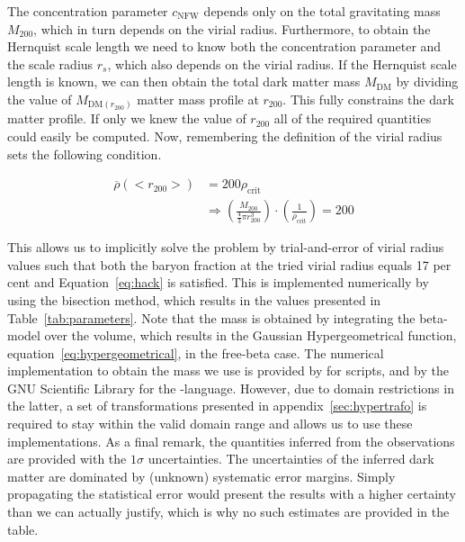 \documentclass[MScProj_TLRH_ClusterEnergy.tex]{subfiles}
\begin{document}
The concentration parameter $c_{\text{NFW}}$ depends only on the total 
gravitating mass $M_{200}$, which in turn depends on the virial radius.
Furthermore, to obtain the Hernquist scale length we need to know both
the concentration parameter and the scale radius $r_s$, which also depends 
on the virial radius. If the Hernquist scale length is known, we can then 
obtain the total dark matter mass $M_{\text{DM}}$ by dividing the value of 
$M_{\text{DM}(r_{200})}$ matter mass profile at $r_{200}$. This fully constrains
the dark matter profile. If only we knew the value of $r_{200}$ all of the
required quantities could easily be computed. Now, remembering the definition 
of the virial radius sets the following condition.

\begin{align}
    \overline{\rho}(<r_{200}>) &= 200 \rho_{\text{crit}} \\
    &\Rightarrow \left(\frac{M_{200}}{\frac{4}{3} \pi r_{200}^3} \right) \cdot
    \left( \frac{1}{\rho_{\text{crit}}} \right) = 200 \label{eq:hack}
\end{align}

This allows us to implicitly solve the problem by trial-and-error of virial 
radius values such that both the baryon fraction at the tried virial radius 
equals 17 per cent and Equation~\eqref{eq:hack} is satisfied. This is implemented
numerically by using the bisection method, which results in the values presented
in Table~\ref{tab:parameters}. Note that the mass is obtained by integrating the
beta-model over the volume, which results in the Gaussian Hypergeometrical 
function, equation~\eqref{eq:hypergeometrical}, in the free-beta case. The 
numerical implementation to obtain the mass we use is provided by 
for  scripts, and by the GNU Scientific Library for the 
-language. However, due to domain restrictions in the latter, a set of 
transformations presented in appendix~\ref{sec:hypertrafo} is required to stay
within the valid domain range and allows us to use these implementations. As a
final remark, the quantities inferred from the observations are provided with 
the $1 \sigma$ uncertainties. The uncertainties of the inferred dark matter are 
dominated by (unknown) systematic error margins. Simply propagating the 
statistical error would present the results with a higher certainty than we can
actually justify, which is why no such estimates are provided in the table.
\end{document}
